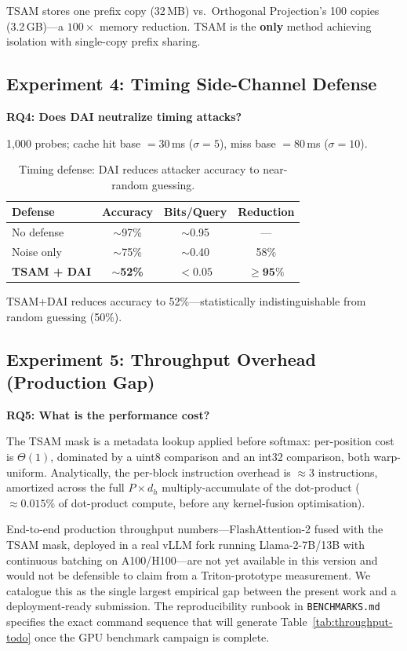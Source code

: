 \documentclass[11pt]{article}
\begin{document}
TSAM stores one prefix copy (32\,MB) vs.\ Orthogonal Projection's 100 copies (3.2\,GB)---a $100\times$ memory reduction. TSAM is the \textbf{only} method achieving isolation with single-copy prefix sharing.

\subsection{Experiment 4: Timing Side-Channel Defense}

\textbf{RQ4: Does DAI neutralize timing attacks?}

1,000 probes; cache hit base $= 30$\,ms ($\sigma = 5$), miss base $= 80$\,ms ($\sigma = 10$).

\begin{table}[t]
\centering
\caption{Timing defense: DAI reduces attacker accuracy to near-random guessing.}
\label{tab:timing}
\begin{tabular}{@{}lccc@{}}
\toprule
\textbf{Defense} & \textbf{Accuracy} & \textbf{Bits/Query} & \textbf{Reduction} \\
\midrule
No defense & $\sim$97\% & $\sim$0.95 & --- \\
Noise only & $\sim$75\% & $\sim$0.40 & 58\% \\
\textbf{TSAM + DAI} & $\mathbf{\sim}$\textbf{52\%} & $\mathbf{< 0.05}$ & $\mathbf{\geq 95\%}$ \\
\bottomrule
\end{tabular}
\end{table}

TSAM+DAI reduces accuracy to 52\%---statistically indistinguishable from random guessing (50\%).

\subsection{Experiment 5: Throughput Overhead (Production Gap)}
\label{sec:experiments:throughput}

\textbf{RQ5: What is the performance cost?}

The TSAM mask is a metadata lookup applied before softmax: per-position
cost is $\Theta(1)$, dominated by a uint8 comparison and an int32
comparison, both warp-uniform.  Analytically, the per-block instruction
overhead is $\approx$3 instructions, amortized across the full
$P \times d_h$ multiply-accumulate of the dot-product
($\approx 0.015\%$ of dot-product compute, before any kernel-fusion
optimisation).

End-to-end production throughput numbers---FlashAttention-2 fused with the
TSAM mask, deployed in a real vLLM fork running Llama-2-7B/13B with
continuous batching on A100/H100---are not yet available in this version
and would not be defensible to claim from a Triton-prototype measurement.
We catalogue this as the single largest empirical gap between the present
work and a deployment-ready submission.  The reproducibility runbook in
\texttt{BENCHMARKS.md} specifies the exact command sequence that will
generate Table~\ref{tab:throughput-todo} once the GPU benchmark campaign
is complete.
\end{document}
